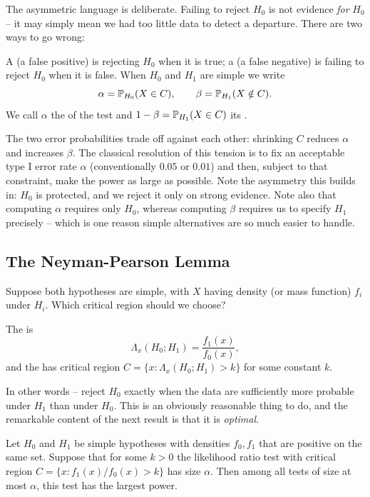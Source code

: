 \documentclass[a4paper]{scrartcl}
\begin{document}
The asymmetric language is deliberate. Failing to reject $H_0$ is not evidence \emph{for} $H_0$ -- it may simply mean we had too little data to detect a departure. There are two ways to go wrong:

\begin{definition}
  A  (a false positive) is rejecting $H_0$ when it is true; a  (a false negative) is failing to reject $H_0$ when it is false. When $H_0$ and $H_1$ are simple we write
  $$
  \alpha = \mathbb{P}_{H_0}(X \in C), \qquad \beta = \mathbb{P}_{H_1}(X \notin C).
  $$
  We call $\alpha$ the  of the test and $1 - \beta = \mathbb{P}_{H_1}(X \in C)$ its .
\end{definition}

The two error probabilities trade off against each other: shrinking $C$ reduces $\alpha$ and increases $\beta$. The classical resolution of this tension is to fix an acceptable type I error rate $\alpha$ (conventionally $0.05$ or $0.01$) and then, subject to that constraint, make the power as large as possible. Note the asymmetry this builds in: $H_0$ is protected, and we reject it only on strong evidence. Note also that computing $\alpha$ requires only $H_0$, whereas computing $\beta$ requires us to specify $H_1$ precisely -- which is one reason simple alternatives are so much easier to handle.

\subsection{The Neyman-Pearson Lemma}

Suppose both hypotheses are simple, with $X$ having density (or mass function) $f_i$ under $H_i$. Which critical region should we choose?

\begin{definition}
  The  is
  $$
  \Lambda_x(H_0; H_1) = \frac{f_1(x)}{f_0(x)},
  $$
  and the  has critical region $C = \{x : \Lambda_x(H_0;H_1) > k\}$ for some constant $k$.
\end{definition}

In other words -- reject $H_0$ exactly when the data are sufficiently more probable under $H_1$ than under $H_0$. This is an obviously reasonable thing to do, and the remarkable content of the next result is that it is \emph{optimal}.

\begin{lemma}
  Let $H_0$ and $H_1$ be simple hypotheses with densities $f_0, f_1$ that are positive on the same set. Suppose that for some $k > 0$ the likelihood ratio test with critical region $C = \{x : f_1(x)/f_0(x) > k\}$ has size $\alpha$. Then among all tests of size at most $\alpha$, this test has the largest power.
\end{lemma}
\end{document}
